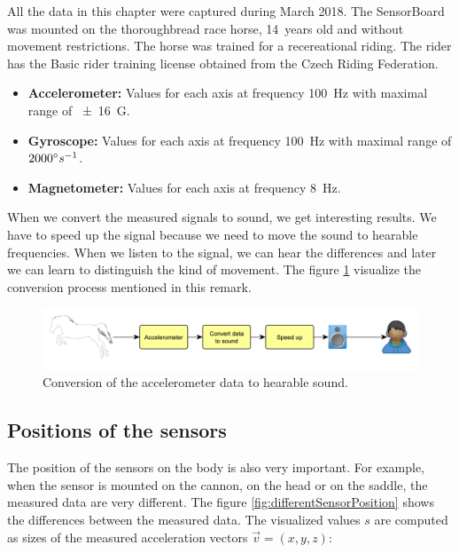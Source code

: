 All the data in this chapter were captured during March 2018. The SensorBoard was mounted on the thoroughbread race horse, 14~years old and without movement restrictions. The horse was trained for a recereational riding. The rider has the Basic rider training license obtained from the Czech Riding Federation.

\begin{itemize}
    \item \textbf{Accelerometer:} Values for each axis at frequency \SI{100}{Hz} with maximal range of \SI{\pm 16}{G}.
    \item \textbf{Gyroscope:} Values for each axis at frequency \SI{100}{Hz} with maximal range of $2000 \degree s^{-1}$.
    \item \textbf{Magnetometer:} Values for each axis at frequency \SI{8}{Hz}.
\end{itemize}

\begin{remark}
    When we convert the measured signals to sound, we get interesting results. We have to speed up the signal because we need to move the sound to hearable frequencies. When we listen to the signal, we can hear the differences and later we can learn to distinguish the kind of movement. The figure \ref{accToSound} visualize the conversion process mentioned in this remark.
    
    \begin{figure}[H]
        \centering
        \caption{Conversion of the accelerometer data to hearable sound.}
        \label{accToSound}
        \includegraphics[width=\linewidth]{img/accToSound.pdf}
    \end{figure}
\end{remark}

\subsection{Positions of the sensors}
The position of the sensors on the body is also very important. For example, when the sensor is mounted on the cannon, on the head or on the saddle, the measured data are very different. The figure \ref{fig:differentSensorPosition} shows the differences between the measured data. The visualized values $s$ are computed as sizes of the measured acceleration vectors $\vec{v} = (x,y,z)$:

